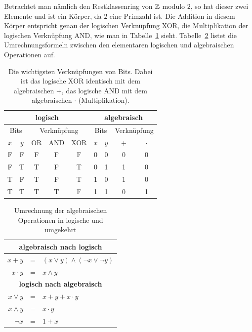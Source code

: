 \begin{refsegment}
Betrachtet man nämlich den Restklassenring von $\mathbb{Z}$ modulo $2$, so
hat dieser zwei Elemente und ist ein Körper,
da $2$ eine Primzahl ist. Die Addition in diesem Körper
entspricht genau der logischen Verknüpfung XOR,
die Multiplikation der logischen Verknüpfung AND,
wie man in Tabelle~\ref{t-bool-xor} sieht. Tabelle~\ref{t-bool-trf}
listet die Umrechnungsformeln zwischen den elementaren logischen
und algebraischen Operationen auf.

\begin{table}[h]
\begin{center}
\begin{tabular}{|cc|ccc||cc|cc|} \hline
   \multicolumn{5}{|c||}{\bf logisch} & \multicolumn{4}{c|}{\bf algebraisch} \\ \hline
   \multicolumn{2}{|c|}{Bits} & \multicolumn{3}{|c||}{Verknüpfung} &
        \multicolumn{2}{|c|}{Bits} & \multicolumn{2}{|c|}{Verknüpfung} \\ \hline
   $x$ & $y$ & OR & AND & XOR & $x$ & $y$ & + & $\cdot$ \\ \hline
    F  &  F  & F  &  F  &  F  &  0  &  0  &  0  &  0    \\
    F  &  T  & T  &  F  &  T  &  0  &  1  &  1  &  0    \\
    T  &  F  & T  &  F  &  T  &  1  &  0  &  1  &  0    \\
    T  &  T  & T  &  T  &  F  &  1  &  1  &  0  &  1    \\
   \hline
\end{tabular}
\end{center}
\caption{Die wichtigsten Verknüpfungen von Bits. Dabei ist das logische
  XOR identisch mit dem algebraischen +, das logische AND mit dem
  algebraischen $\cdot$ (Multiplikation).}\label{t-bool-xor}
\end{table}

\begin{table}[h]
\begin{center}
\begin{tabular}{|rcl|} \hline
   \multicolumn{3}{|c|}{\bf algebraisch nach logisch}          \\ \hline
   $x + y$      & = & $(x \vee y) \wedge (\neg x \vee \neg y)$ \\
   $x \cdot y$  & = & $x \wedge y$                             \\ \hline \hline
   \multicolumn{3}{|c|}{\bf logisch nach algebraisch}          \\ \hline
   $x \vee y$   & = & $x + y + x\cdot y$                       \\
   $x \wedge y$ & = & $x \cdot y$                              \\
   $\neg x$     & = & $1 + x$                                  \\ \hline
\end{tabular}
\end{center}
\caption{Umrechnung der algebraischen Operationen in logische und umgekehrt}\label{t-bool-trf}
\end{table}


\end{refsegment}
